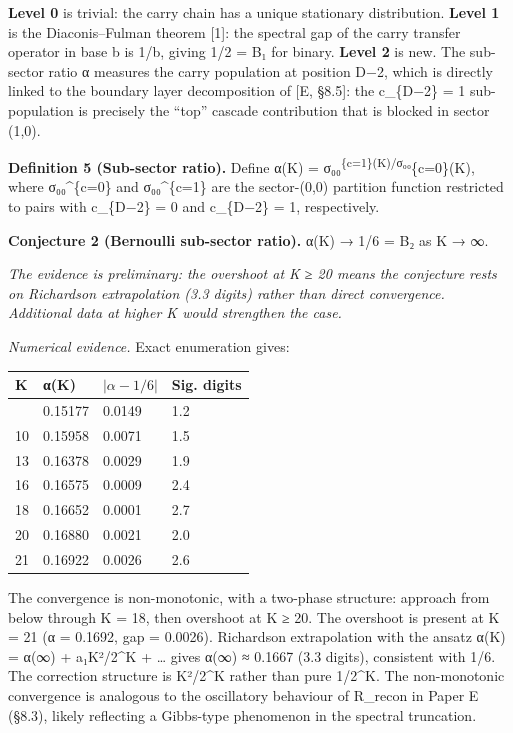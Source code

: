 \documentclass[
  11pt,
]{article}
\begin{document}
\textbf{Level 0} is trivial: the carry chain has a unique stationary
distribution. \textbf{Level 1} is the Diaconis--Fulman theorem {[}1{]}: the
spectral gap of the carry transfer operator in base b is 1/b, giving 1/2 =
\textbar B₁\textbar{} for binary. \textbf{Level 2} is new. The sub-sector ratio
α measures the carry population at position D−2, which is directly linked to the
boundary layer decomposition of {[}E, §8.5{]}: the c\_\{D−2\} = 1 sub-population
is precisely the ``top'' cascade contribution that is blocked in sector (1,0).

\textbf{Definition 5 (Sub-sector ratio).} Define α(K) =
σ₀₀\textsuperscript{\{c=1\}(K)/σ₀₀}\{c=0\}(K), where σ₀₀\^{}\{c=0\} and
σ₀₀\^{}\{c=1\} are the sector-(0,0) partition function restricted to pairs with
c\_\{D−2\} = 0 and c\_\{D−2\} = 1, respectively.

\textbf{Conjecture 2 (Bernoulli sub-sector ratio).} α(K) → 1/6 = B₂ as K → ∞.

\emph{The evidence is preliminary: the overshoot at K ≥ 20 means the conjecture
rests on Richardson extrapolation (3.3 digits) rather than direct convergence.
Additional data at higher K would strengthen the case.}

\emph{Numerical evidence.} Exact enumeration gives:

\begin{longtable}[]{@{}llll@{}}
\toprule\noalign{}
K & α(K) & \(\lvert \alpha - 1/6 \rvert\) & Sig. digits \\
\midrule\noalign{}
\endhead
\bottomrule\noalign{}
\endlastfoot
7 & 0.15177 & 0.0149 & 1.2 \\
10 & 0.15958 & 0.0071 & 1.5 \\
13 & 0.16378 & 0.0029 & 1.9 \\
16 & 0.16575 & 0.0009 & 2.4 \\
18 & 0.16652 & 0.0001 & 2.7 \\
20 & 0.16880 & 0.0021 & 2.0 \\
21 & 0.16922 & 0.0026 & 2.6 \\
\end{longtable}

The convergence is non-monotonic, with a two-phase structure: approach from
below through K = 18, then overshoot at K ≥ 20. The overshoot is present at K =
21 (α = 0.1692, gap = 0.0026). Richardson extrapolation with the ansatz α(K) =
α(∞) + a₁K²/2\^{}K + \ldots{} gives α(∞) ≈ 0.1667 (3.3 digits), consistent with
1/6. The correction structure is K²/2\^{}K rather than pure 1/2\^{}K. The
non-monotonic convergence is analogous to the oscillatory behaviour of R\_recon
in Paper E (§8.3), likely reflecting a Gibbs-type phenomenon in the spectral
truncation.
\end{document}

